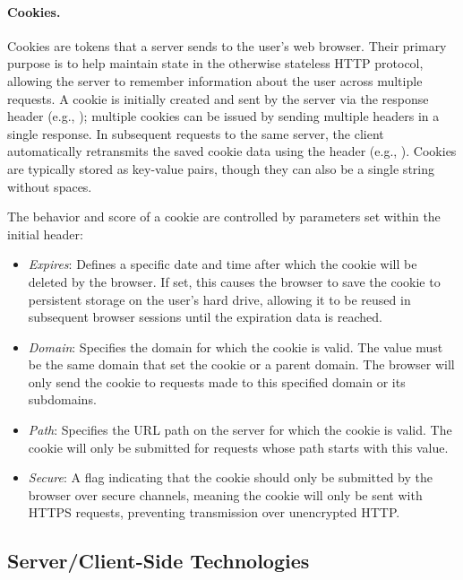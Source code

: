 \paragraph{Cookies.} Cookies are tokens that a server sends to the user's web browser. Their primary purpose is to help maintain state in the otherwise stateless HTTP protocol, allowing the server to remember information about the user across multiple requests. A cookie is initially created and sent by the server via the response header  (e.g., ); multiple cookies can be issued by sending multiple  headers in a single response. In subsequent requests to the same server, the client automatically retransmits the saved cookie data using the  header (e.g., ). Cookies are typically stored as key-value pairs, though they can also be a single string without spaces.

The behavior and score of a cookie are controlled by parameters set within the initial  header:

\begin{itemize}
    \item \textit{Expires}: Defines a specific date and time after which the cookie will be deleted by the browser. If set, this causes the browser to save the cookie to persistent storage on the user's hard drive, allowing it to be reused in subsequent browser sessions until the expiration data is reached.
    \item \textit{Domain}: Specifies the domain for which the cookie is valid. The value must be the same domain that set the cookie or a parent domain. The browser will only send the cookie to requests made to this specified domain or its subdomains.
    \item \textit{Path}: Specifies the URL path on the server for which the cookie is valid. The cookie will only be submitted for requests whose path starts with this value.
    \item \textit{Secure}: A flag indicating that the cookie should only be submitted by the browser over secure channels, meaning the cookie will only be sent with HTTPS requests, preventing transmission over unencrypted HTTP.
\end{itemize}

\subsection{Server/Client-Side Technologies}

